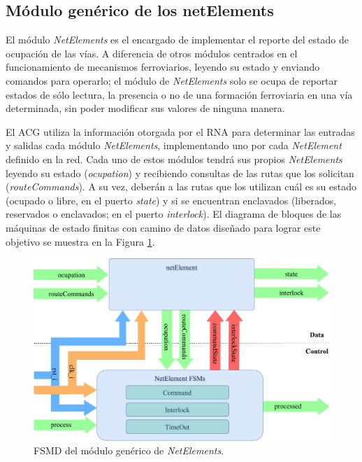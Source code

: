 \subsection{Módulo genérico de los netElements}

El módulo \textit{NetElements} es el encargado de implementar el reporte del estado de ocupación de las vías. A diferencia de otros módulos centrados en el funcionamiento de mecanismos ferroviarios, leyendo su estado y enviando comandos para operarlo; el módulo de \textit{NetElements} solo se ocupa de reportar estados de sólo lectura, la presencia o no de una formación ferroviaria en una vía determinada, sin poder modificar sus valores de ninguna manera.

El ACG utiliza la información otorgada por el RNA para determinar las entradas y salidas cada módulo \textit{NetElements}, implementando uno por cada \textit{NetElement} definido en la red. Cada uno de estos módulos tendrá sus propios \textit{NetElements} leyendo su estado (\textit{ocupation}) y recibiendo consultas de las rutas que los solicitan (\textit{routeCommands}). A su vez, deberán a las rutas que los utilizan cuál es su estado (ocupado o libre, en el puerto \textit{state}) y si se encuentran enclavados (liberados, reservados o enclavados; en el puerto \textit{interlock}). El diagrama de bloques de las máquinas de estado finitas con camino de datos diseñado para lograr este objetivo se muestra en la Figura \ref{fig:NET_module}.

\begin{figure}[H]
	\centering
	\includegraphics[width=1\textwidth]{Figuras/NET_module}
	\centering\caption{FSMD del módulo genérico de \textit{NetElements}.}
	\label{fig:NET_module}
\end{figure}

